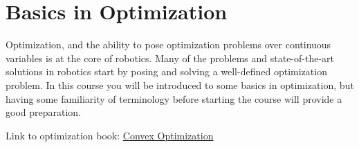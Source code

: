 \documentclass[11pt,letterpaper]{article}
\begin{document}
\section*{Basics in Optimization}

Optimization, and the ability to pose optimization problems over continuous variables is at the core of robotics. Many of the problems and state-of-the-art solutions in robotics start by posing and solving a well-defined optimization problem. In this course you will be introduced to some basics in optimization, but having some familiarity of terminology before starting the course will provide a good preparation. 

Link to optimization book: \href{https://web.stanford.edu/~boyd/cvxbook/bv_cvxbook.pdf}{Convex Optimization}
\end{document}
